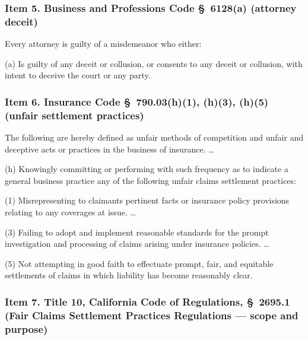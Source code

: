 \subsubsection*{Item 5. Business and Professions Code \S~6128(a) (attorney deceit)}

\begin{quoting}
\noindent Every attorney is guilty of a misdemeanor who either:

\noindent (a) Is guilty of any deceit or collusion, or consents to any deceit or collusion, with intent to deceive the court or any party.
\end{quoting}

\subsubsection*{Item 6. Insurance Code \S~790.03(h)(1), (h)(3), (h)(5) (unfair settlement practices)}

\begin{quoting}
\noindent The following are hereby defined as unfair methods of competition and unfair and deceptive acts or practices in the business of insurance. \dots

\noindent (h) Knowingly committing or performing with such frequency as to indicate a general business practice any of the following unfair claims settlement practices:

\noindent (1) Misrepresenting to claimants pertinent facts or insurance policy provisions relating to any coverages at issue. \dots

\noindent (3) Failing to adopt and implement reasonable standards for the prompt investigation and processing of claims arising under insurance policies. \dots

\noindent (5) Not attempting in good faith to effectuate prompt, fair, and equitable settlements of claims in which liability has become reasonably clear.
\end{quoting}

\subsubsection*{Item 7. Title 10, California Code of Regulations, \S~2695.1 (Fair Claims Settlement Practices Regulations --- scope and purpose)}

